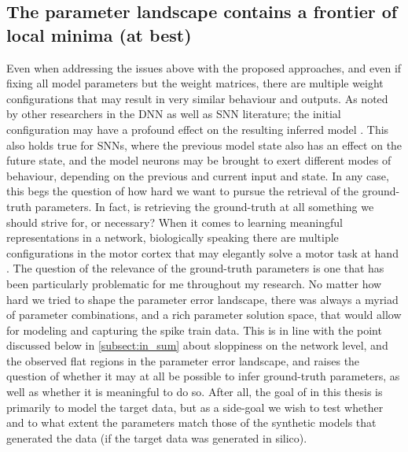 \documentclass[mphil,deptreport,ianc]{infthesis} %
\begin{document}


\subsection*{The parameter landscape contains a frontier of local minima (at best)}

Even when addressing the issues above with the proposed approaches, and even if fixing all model parameters but the weight matrices, there are multiple weight configurations that may result in very similar behaviour and outputs.
As noted by other researchers in the DNN as well as SNN literature; the initial configuration may have a profound effect on the resulting inferred model \cite{Thimm1995NeuralInitialization, BenAtitallah2022RandomlyImages, Sun2020EvolvingClassification}. 
This also holds true for SNNs, where the previous model state also has an effect on the future state, and the model neurons may be brought to exert different modes of behaviour, depending on the previous and current input and state.
In any case, this begs the question of how hard we want to pursue the retrieval of the ground-truth parameters. 
In fact, is retrieving the ground-truth at all something we should strive for, or necessary?
When it comes to learning meaningful representations in a network, biologically speaking there are multiple configurations in the motor cortex that may elegantly solve a motor task at hand \cite{Marblestone2016}.
The question of the relevance of the ground-truth parameters is one that has been particularly problematic for me throughout my research. 
No matter how hard we tried to shape the parameter error landscape, there was always a myriad of parameter combinations, and a rich parameter solution space, that would allow for modeling and capturing the spike train data.
This is in line with the point discussed below in \ref{subsect:in_sum} about sloppiness on the network level, and the observed flat regions in the parameter error landscape, and raises the question of whether it may at all be possible to infer ground-truth parameters, as well as whether it is meaningful to do so.
After all, the goal of in this thesis is primarily to model the target data, but as a side-goal we wish to test whether and to what extent the parameters match those of the synthetic models that generated the data (if the target data was generated in silico).
\end{document}
